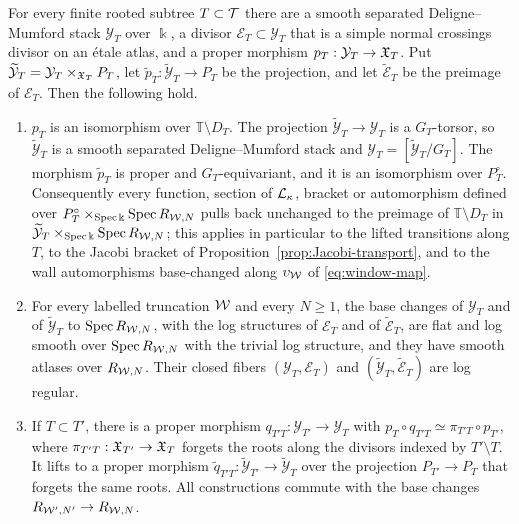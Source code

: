 \begin{theorem}
\label{thm:regular-presentation}
For every finite rooted subtree $T\subset\mathcal T$ there are a smooth
separated Deligne--Mumford stack $\mathcal Y_T$ over $\Bbbk$, a divisor
$\mathcal E_T\subset\mathcal Y_T$ that is a simple normal crossings divisor
on an \'etale atlas, and a proper morphism
$p_T:\mathcal Y_T\to\mathfrak X_T$.  Put
$\widetilde{\mathcal Y}_T=\mathcal Y_T\times_{\mathfrak X_T}P_T$, let
$\widetilde p_T:\widetilde{\mathcal Y}_T\to P_T$ be the projection, and let
$\widetilde{\mathcal E}_T$ be the preimage of $\mathcal E_T$.  Then the
following hold.
\begin{enumerate}
\item $p_T$ is an isomorphism over $\mathbb T\setminus D_T$.  The projection
$\widetilde{\mathcal Y}_T\to\mathcal Y_T$ is a $G_T$-torsor, so
$\widetilde{\mathcal Y}_T$ is a smooth separated Deligne--Mumford stack and
$\mathcal Y_T=[\widetilde{\mathcal Y}_T/G_T]$.  The morphism $\widetilde p_T$
is proper and $G_T$-equivariant, and it is an isomorphism over
$P_T^\circ$.  Consequently every function, section of $\mathcal L_\kappa$,
bracket or automorphism defined over
$P_T^\circ\times_{\operatorname{Spec}\Bbbk}\operatorname{Spec} R_{\mathcal W,N}$ pulls back unchanged to the
preimage of $\mathbb T\setminus D_T$ in
$\widetilde{\mathcal Y}_T\times_{\operatorname{Spec}\Bbbk}\operatorname{Spec} R_{\mathcal W,N}$; this applies
in particular to the lifted transitions along $T$, to the Jacobi bracket of
Proposition~\ref{prop:Jacobi-transport}, and to the wall automorphisms
base-changed along $\upsilon_\mathcal W$ of \eqref{eq:window-map}.
\item For every labelled truncation $\mathcal W$ and every $N\geq1$, the base
changes of $\mathcal Y_T$ and of $\widetilde{\mathcal Y}_T$ to
$\operatorname{Spec} R_{\mathcal W,N}$, with
the log structures of $\mathcal E_T$ and of $\widetilde{\mathcal E}_T$, are
flat and log smooth over $\operatorname{Spec} R_{\mathcal W,N}$ with the trivial log
structure, and they have smooth atlases over $R_{\mathcal W,N}$.  Their closed
fibers $(\mathcal Y_T,\mathcal E_T)$ and
$(\widetilde{\mathcal Y}_T,\widetilde{\mathcal E}_T)$ are log regular.
\item If $T\subset T'$, there is a proper morphism
$q_{T'T}:\mathcal Y_{T'}\to\mathcal Y_T$ with
$p_T\circ q_{T'T}\simeq\pi_{T'T}\circ p_{T'}$, where
$\pi_{T'T}:\mathfrak X_{T'}\to\mathfrak X_T$ forgets the roots along the divisors
indexed by $T'\setminus T$.  It lifts to a proper morphism
$\widetilde q_{T'T}:\widetilde{\mathcal Y}_{T'}\to\widetilde{\mathcal Y}_T$
over the projection $P_{T'}\to P_T$ that forgets the same roots.  All
constructions commute with the base changes $R_{\mathcal W',N'}\to R_{\mathcal W,N}$.
\end{enumerate}
\end{theorem}

